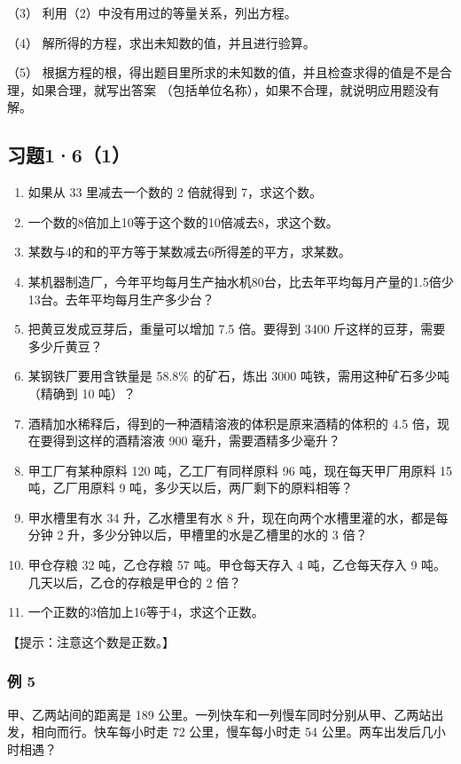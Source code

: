 （3） 利用（2）中没有用过的等量关系，列出方程。

（4） 解所得的方程，求出未知数的值，并且进行验算。

（5）
根据方程的根，得出题目里所求的未知数的值，并且检查求得的值是不是合理，如果合理，就写出答案
（包括单位名称），如果不合理，就说明应用题没有解。

\subsection{习题1·6（1）}

\begin{enumerate}
\item
  如果从 33 里减去一个数的 2 倍就得到 7，求这个数。
\item
  一个数的8倍加上10等于这个数的10倍减去8，求这个数。
\item
  某数与4的和的平方等于某数减去6所得差的平方，求某数。
\item
  某机器制造厂，今年平均每月生产抽水机80台，比去年平均每月产量的1.5倍少13台。去年平均每月生产多少台？
\item
  把黄豆发成豆芽后，重量可以增加 7.5 倍。要得到 3400
  斤这样的豆芽，需要多少斤黄豆？
\item
  某钢铁厂要用含铁量是 58.8\% 的矿石，炼出 3000
  吨铁，需用这种矿石多少吨（精确到 10 吨）？
\item
  酒精加水稀释后，得到的一种酒精溶液的体积是原来酒精的体积的 4.5
  倍，现在要得到这样的酒精溶液 900 毫升，需要酒精多少毫升？
\item
  甲工厂有某种原料 120 吨，乙工厂有同样原料 96 吨，现在每天甲厂用原料 15
  吨，乙厂用原料 9 吨，多少天以后，两厂剩下的原料相等？
\item
  甲水槽里有水 34 升，乙水槽里有水 8
  升，现在向两个水槽里灌的水，都是每分钟 2
  升，多少分钟以后，甲槽里的水是乙槽里的水的 3 倍？
\item
  甲仓存粮 32 吨，乙仓存粮 57 吨。甲仓每天存入 4 吨，乙仓每天存入 9
  吨。几天以后，乙仓的存粮是甲仓的 2 倍？
\item
  一个正数的3倍加上16等于4，求这个正数。
\end{enumerate}

【提示：注意这个数是正数。】

\subsubsection{例 5}

甲、乙两站间的距离是 189
公里。一列快车和一列慢车同时分别从甲、乙两站出发，相向而行。快车每小时走
72 公里，慢车每小时走 54 公里。两车出发后几小时相遇？

